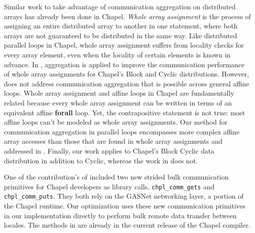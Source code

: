 \begin{comment}
This writeup is very confusing. You need to clearly state that the method in [15] only works for aggregate array assignments, and not for general affine loops. [This is alluded to, but you need to reword to make this absolutely clear.

Eg: "goes beyond" is ambigious. Goes beyond in what way?
\end{comment}

Similar work to take advantage of communication aggregation on distributed arrays has already been done in Chapel. \textit{Whole array assignment} is the process of assigning an entire distributed array to another in one statement, where both arrays are not guaranteed to be distributed in the same way. Like distributed parallel loops in Chapel, whole array assignment suffers from locality checks for every array element, even when the locality of certain elements is known in advance. In \cite{sanz2012global}, aggregation is applied to improve the communication performance of whole array assignments for Chapel's Block and Cyclic distributions. However, \cite{sanz2012global} does not address communication aggregation that is possible across general affine loops. Whole array assignment and affine loops in Chapel are fundamentally related because every whole array assignment can be written in terms of an equivalent affine \textbf{forall} loop. Yet, the contrapositive statement is not true: most affine loops can't be modeled as whole array assignments. Our method for communication aggregation in parallel loops encompasses more complex affine array accesses than those that are found in whole array assignments and addressed in \cite{sanz2012global}. Finally, our work applies to Chapel's Block Cyclic data distribution in addition to Cyclic, whereas the work in \cite{sanz2012global} does not.  

One of the contribution's of \cite{sanz2012global} included two new strided bulk communication primitives for Chapel developers as library calls, \texttt{chpl\_comm\_gets} and \texttt{chpl\_comm\_puts}. They both rely on the GASNet networking layer, a portion of the Chapel runtime.  Our optimization uses these new communication primitives in our implementation directly to perform bulk remote data transfer between locales. The methods in \cite{sanz2012global} are already in the current release of the Chapel compiler. 

